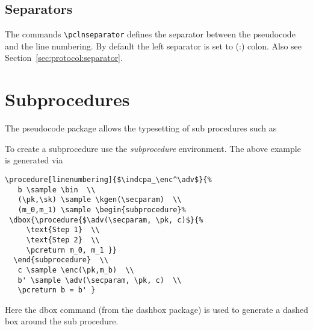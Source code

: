 \documentclass[a4paper]{report}
\begin{document}
\subsection{Separators}
The commands \lstinline$\pclnseparator$ defines the separator between the pseudocode and the line numbering. By
default the left separator is set to (:) colon. Also see Section~\ref{sec:protocol:separator}.


\section{Subprocedures}
The pseudocode package allows the typesetting of sub procedures such as

\begin{center}
 \end{center}
 
To create a subprocedure use the \emph{subprocedure} environment. The above example is generated via
 \begin{lstlisting}
\procedure[linenumbering]{$\indcpa_\enc^\adv$}{%
   b \sample \bin  \\
   (\pk,\sk) \sample \kgen(\secparam)  \\
   (m_0,m_1) \sample \begin{subprocedure}%
 \dbox{\procedure{$\adv(\secparam, \pk, c)$}{%
  	 \text{Step 1}  \\
  	 \text{Step 2}  \\
	 \pcreturn m_0, m_1 }}
  \end{subprocedure}  \\
   c \sample \enc(\pk,m_b)  \\
   b' \sample \adv(\secparam, \pk, c)  \\
   \pcreturn b = b' }
\end{lstlisting}
Here the dbox command (from the dashbox package) is used to generate a dashed box around the sub procedure. 
\end{document}
